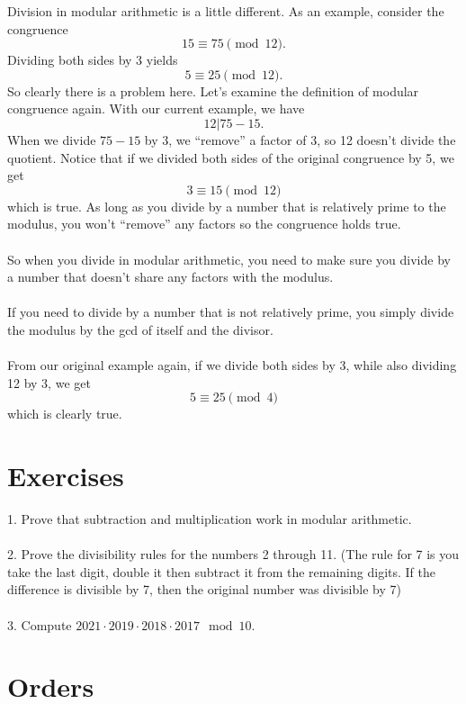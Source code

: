 \documentclass{article}
\begin{document}
Division in modular arithmetic is a little different. As an example, consider the congruence
$$15 \equiv 75 \pmod{12}.$$
Dividing both sides by 3 yields $$5 \equiv 25 \pmod{12}.$$
So clearly there is a problem here.
Let's examine the definition of modular congruence again.
With our current example, we have 
$$12 | 75-15.$$
When we divide $75-15$ by 3, we ``remove'' a factor of 3, so 12 doesn't divide the quotient.
Notice that if we divided both sides of the original congruence by 5, we get 
$$3 \equiv 15 \pmod{12}$$ which is true. As long as you divide by a number that is relatively prime to the modulus,
you won't ``remove'' any factors so the congruence holds true.\\\\
So when you divide in modular arithmetic, you need to make sure you divide by a number that doesn't share any factors with the modulus.
\\\\
If you need to divide by a number that is not relatively prime, you simply divide the modulus by the gcd of itself and the divisor. 
\\\\
From our original example again, if we divide both sides by 3, while also dividing 12 by 3, we get 
$$5 \equiv 25 \pmod{4}$$ which is clearly true.

\section*{Exercises}
1. Prove that subtraction and multiplication work in modular arithmetic.
\\
\\
2. Prove the divisibility rules for the numbers 2 through 11. (The rule for 7 is you take the last digit, double it then subtract it from the remaining digits. If the difference is divisible by 7, then the original number was divisible by 7)
\\
\\
3. Compute $2021 \cdot 2019 \cdot 2018 \cdot 2017 \mod{10}$.

\section*{Orders}
\end{document}
